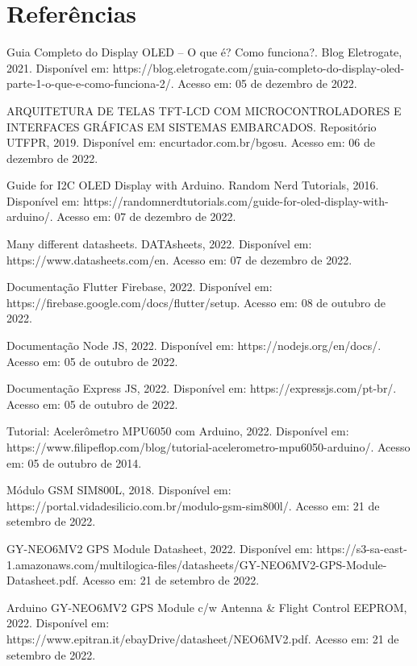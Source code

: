 \documentclass[openright]{normas-utf-tex} %
\begin{document}
\chapter{Referências}
Guia Completo do Display OLED – O que é? Como funciona?. Blog Eletrogate, 2021. Disponível em: https://blog.eletrogate.com/guia-completo-do-display-oled-parte-1-o-que-e-como-funciona-2/. Acesso em: 05 de dezembro de 2022.

ARQUITETURA DE TELAS TFT-LCD COM MICROCONTROLADORES E INTERFACES GRÁFICAS EM SISTEMAS EMBARCADOS. Repositório UTFPR, 2019. Disponível em: encurtador.com.br/bgosu. Acesso em: 06 de dezembro de 2022.

Guide for I2C OLED Display with Arduino. Random Nerd Tutorials, 2016. Disponível em: https://randomnerdtutorials.com/guide-for-oled-display-with-arduino/. Acesso em: 07 de dezembro de 2022.

Many different datasheets. DATAsheets, 2022. Disponível em: https://www.datasheets.com/en. Acesso em: 07 de dezembro de 2022.

Documentação Flutter Firebase, 2022. Disponível em: https://firebase.google.com/docs/flutter/setup. Acesso em: 08 de outubro de 2022.

Documentação Node JS, 2022. Disponível em: https://nodejs.org/en/docs/. Acesso em: 05 de outubro de 2022.

Documentação Express JS, 2022. Disponível em: https://expressjs.com/pt-br/. Acesso em: 05 de outubro de 2022.

Tutorial: Acelerômetro MPU6050 com Arduino, 2022. Disponível em: https://www.filipeflop.com/blog/tutorial-acelerometro-mpu6050-arduino/. Acesso em: 05 de outubro de 2014.

Módulo GSM SIM800L, 2018. Disponível em: https://portal.vidadesilicio.com.br/modulo-gsm-sim800l/. Acesso em: 21 de setembro de 2022.

GY-NEO6MV2 GPS Module Datasheet, 2022. Disponível em: https://s3-sa-east-1.amazonaws.com/multilogica-files/datasheets/GY-NEO6MV2-GPS-Module-Datasheet.pdf. Acesso em: 21 de setembro de 2022.

Arduino GY-NEO6MV2 GPS Module c/w Antenna & Flight Control EEPROM, 2022. Disponível em: https://www.epitran.it/ebayDrive/datasheet/NEO6MV2.pdf. Acesso em: 21 de setembro de 2022.
\end{document}
